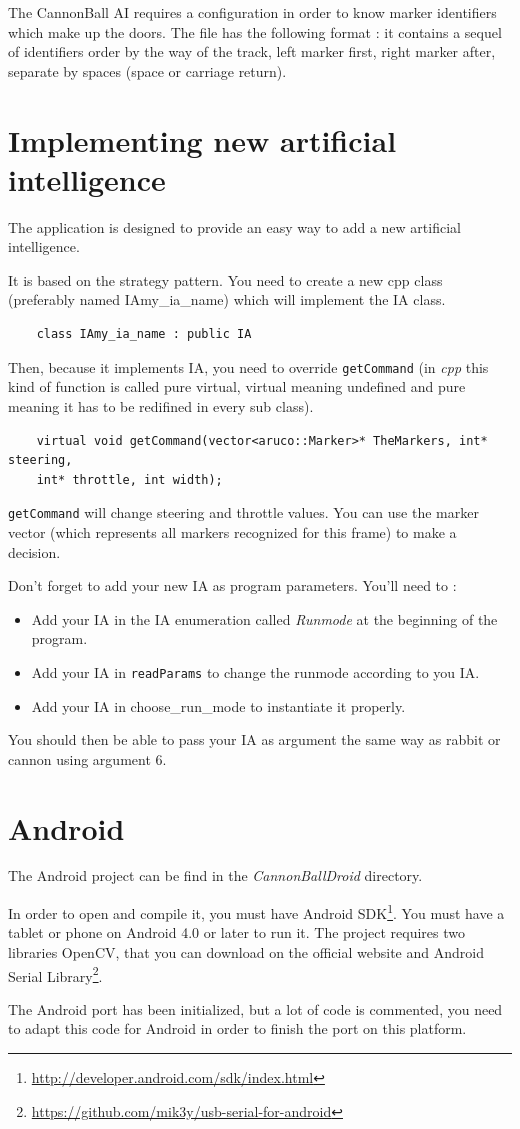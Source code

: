 \documentclass[a4paper,11pt]{report}
\begin{document}
The CannonBall AI requires a configuration in order to know marker identifiers
which make up the doors. The file has the following format : it contains a
sequel of identifiers order by the way of the track, left marker first, right
marker after, separate by spaces (space or carriage return).

\section{Implementing new artificial intelligence}

The application is designed to provide an easy way to add a new artificial
intelligence.

It is based on the strategy pattern. You need to create a new cpp class
(preferably named IAmy\_ia\_name) which will implement the IA class.
\begin{verbatim}
    class IAmy_ia_name : public IA
\end{verbatim}
Then, because it implements IA, you need to override \texttt{getCommand} (in
\emph{cpp} this kind of function is called pure virtual, virtual meaning
undefined and pure meaning it has to be redifined in every sub class).
\begin{verbatim}
	virtual void getCommand(vector<aruco::Marker>* TheMarkers, int* steering,
    int* throttle, int width);
\end{verbatim}
\texttt{getCommand} will change steering and throttle values. You can use the marker
vector (which represents all markers recognized for this frame) to make a
decision.

Don't forget to add your new IA as program parameters. You'll need to :
\begin{itemize}
    \item Add your IA in the IA enumeration called \emph{Runmode} at the beginning of the
        program.
    \item Add your IA in \texttt{readParams} to change the runmode according to you IA.
    \item Add your IA in choose\_run\_mode to instantiate it properly.
\end{itemize}
You should then be able to pass your IA as argument the same way as rabbit or
cannon using argument 6.

\section{Android}

The Android project can be find in the \emph{CannonBallDroid} directory.

In order to open and compile it, you must have Android
SDK\footnote{\url{http://developer.android.com/sdk/index.html}}.
You must have a tablet or phone on Android 4.0 or later to run it.
The project requires two libraries OpenCV, that you can download on the
official website and Android Serial
Library\footnote{\url{https://github.com/mik3y/usb-serial-for-android}}.

The Android port has been initialized, but a lot of code is commented, you
need to adapt this code for Android in order to finish the port on this
platform.
\end{document}
